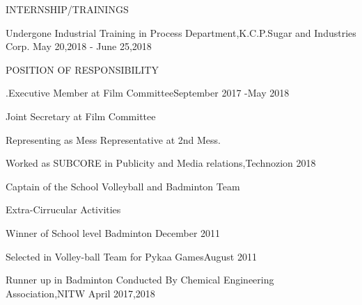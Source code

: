 \documentclass{resume} %
\begin{document}




\begin{rSection}{INTERNSHIP/TRAININGS} \itemsep -3pt  

{Undergone Industrial Training in Process Department,K.C.P.Sugar and Industries Corp.} \hfill May 20,2018 - June 25,2018 \

\end{rSection} 

\begin{rSection}{POSITION OF RESPONSIBILITY}

\begin{rSubsection}{.Executive Member at Film Committee}{September 2017 -May 2018} {} {} 
\item Joint Secretary at Film Committee
\item Representing as Mess Representative at 2nd Mess.
\item Worked as SUBCORE in Publicity and Media relations,Technozion 2018
\item Captain of the School Volleyball and Badminton Team
\end{rSubsection}




 
 

 
\end{rSection}

\begin{rSection}{Extra-Cirrucular Activities} \itemsep -1pt {}   
\item Winner of School level Badminton \hfill December 2011
\item Selected in Volley-ball Team for Pykaa Games\hfill August 2011
\item Runner up in Badminton Conducted By Chemical Engineering Association,NITW \hfill April 2017,2018


 

\end{rSection}
\end{document}
